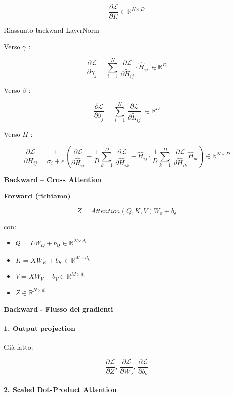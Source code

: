 \documentclass[
  11pt,
]{article}
\begin{document}
\[\frac{\partial\mathcal{L}}{\partial H} \in \mathbb{R}^{N \times D}\]

Riassunto backward LayerNorm

Verso \(\gamma\) :

\[\frac{\partial\mathcal{L}}{\partial\gamma_{j}} = \sum_{i = 1}^{N}\,\frac{\partial\mathcal{L}}{\partial{\widetilde{H}}_{ij}} \cdot {\widehat{H}}_{ij}\  \in \mathbb{R}^{D}\]

Verso \(\beta\) :

\[\frac{\partial\mathcal{L}}{\partial\beta_{j}} = \sum_{i = 1}^{N}\,\frac{\partial\mathcal{L}}{\partial{\widetilde{H}}_{ij}}\  \in \mathbb{R}^{D}\]

Verso \(H\) :

\[\frac{\partial\mathcal{L}}{\partial H_{ij}} = \frac{1}{\sigma_{i} + \epsilon}\left( \frac{\partial\mathcal{L}}{\partial{\widehat{H}}_{ij}} - \frac{1}{D}\sum_{k = 1}^{D}\,\frac{\partial\mathcal{L}}{\partial{\widehat{H}}_{ik}} - {\widehat{H}}_{ij} \cdot \frac{1}{D}\sum_{k = 1}^{D}\,\frac{\partial\mathcal{L}}{\partial{\widehat{H}}_{ik}}{\widehat{H}}_{ik} \right) \in \mathbb{R}^{N \times D}\]

\textbf{Backward -- Cross Attention}

\textbf{Forward (richiamo)}

\[Z = Attention(Q,K,V)W_{o} + b_{o}\]

con:

\begin{itemize}
\item
  \(Q = LW_{Q} + b_{Q} \in \mathbb{R}^{N \times d_{k}}\)
\item
  \(K = XW_{K} + b_{K} \in \mathbb{R}^{M \times d_{k}}\)
\item
  \(V = XW_{V} + b_{V} \in \mathbb{R}^{M \times d_{v}}\)
\item
  \(Z \in \mathbb{R}^{N \times d_{v}}\)
\end{itemize}

\textbf{Backward - Flusso dei gradienti}

\paragraph{1. Output projection}

Già fatto:

\[\frac{\partial\mathcal{L}}{\partial Z},\ \frac{\partial\mathcal{L}}{\partial W_{o}},\ \frac{\partial\mathcal{L}}{\partial b_{o}}\]

\paragraph{2. Scaled Dot-Product Attention}
\end{document}
